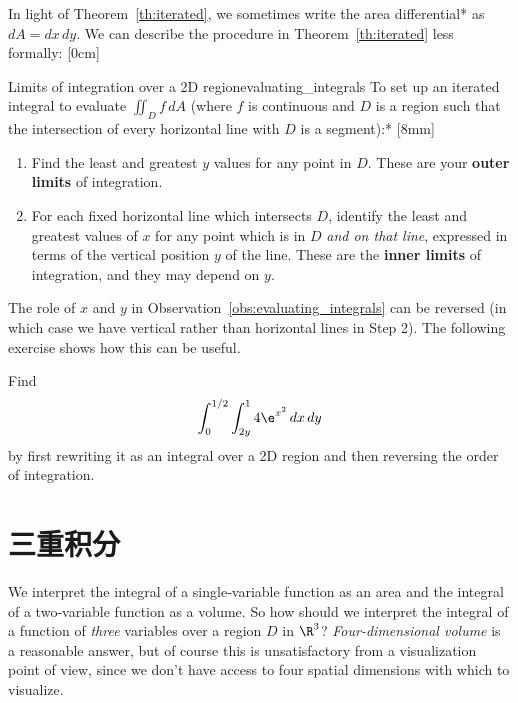 \documentclass[indent]{watsonbook}
\begin{document}
{In light of Theorem~\ref{th:iterated}, we sometimes write the area
differential* as ${d} A = {d} x \, {d} y$. We can describe the procedure
in Theorem~\ref{th:iterated} less formally: [0cm]
\begin{obs}{Limits of integration over a 2D
    region}{evaluating_integrals}
  To set up an iterated integral to evaluate $\iint_D f \, {{d}}A$
  (where $f$ is continuous and $D$ is a region such that the
  intersection of every horizontal line with $D$ is a segment):*
  [8mm]
  \begin{enumerate}[leftmargin=12pt, itemsep = 6pt, topsep = 5pt]
  \item Find the least and greatest $y$ values for any point in
    $D$. These are your \textbf{outer limits} of integration.
  \item For each fixed horizontal line which intersects $D$, identify
    the least and greatest values of $x$ for any point which is in $D$
    \textit{and on that line}, expressed in terms of the vertical
    position $y$ of the line. These are the \textbf{inner limits} of
    integration, and they may depend on $y$.
  \end{enumerate}
\end{obs}

The role of $x$ and $y$ in Observation~\ref{obs:evaluating_integrals}
can be reversed (in which case we have vertical rather than horizontal
lines in Step 2). The following exercise shows how this can be useful.

\begin{exercise}{}{}
  Find
  \[
    \int_0^{1/2} \int_{2y}^1 4 \e^{x^2}\, {d} x\, {d} y
  \]
  by first rewriting it as an integral over a 2D region and then
  reversing the order of integration.
\end{exercise}


\section{三重积分} \label{sec:triple}


We interpret the integral of a single-variable function as an area and
the integral of a two-variable function as a volume. So how should we
interpret the integral of a function of \textit{three} variables over
a region $D$ in $\R^3$?  \textit{Four-dimensional volume} is a
reasonable answer, but of course this is unsatisfactory from a
visualization point of view, since we don't have access to four
spatial dimensions with which to visualize.

}
\end{document}
